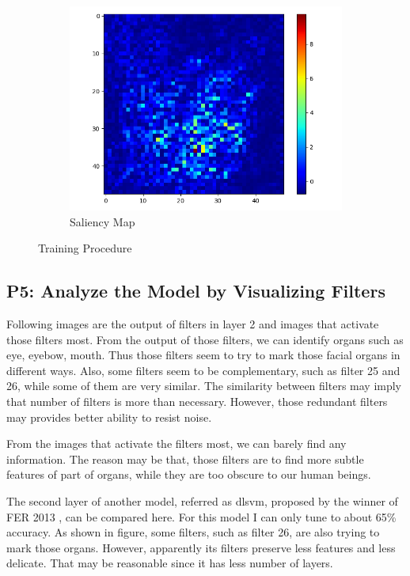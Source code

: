 \documentclass[fleqn,a4paper,12pt]{article}
\begin{document}
\begin{figure}[h]
\begin{subfigure}{.33\textwidth}
  \includegraphics[width=\linewidth]{report-imgs/sa.png}
  \caption{Saliency Map}
  \label{fig:sub1}
\end{subfigure}%
\caption{Training Procedure}
\label{fig:test}
\end{figure}


\subsection*{P5: Analyze the Model by Visualizing Filters}

Following images are the output of filters in layer 2 and images that activate those filters most. From the output of those filters, we can identify organs such as eye, eyebow, mouth. Thus those filters seem to try to mark those facial organs in different ways. Also, some filters seem to be complementary, such as filter 25 and 26, while some of them are very similar. The similarity between filters may imply that number of filters is more than necessary. However, those redundant filters may provides better ability to resist noise.

From the images that activate the filters most, we can barely find any information. The reason may be that, those filters are to find more subtle features of part of organs, while they are too obscure to our human beings.

The second layer of another model, referred as dlsvm, proposed by the winner of FER 2013 \cite{dlsvm}, can be compared here. For this model I can only tune to about 65\% accuracy. As shown in figure, some filters, such as filter 26, are also trying to mark those organs. However, apparently its filters preserve less features and less delicate. That may be reasonable since it has less number of layers.
\end{document}
